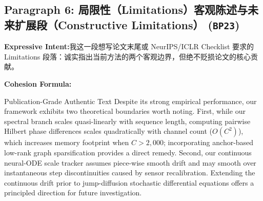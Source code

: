 \subsection*{Paragraph 6: 局限性（Limitations）客观陈述与未来扩展段（Constructive Limitations） (\texttt{BP23})}
\noindent\textbf{Expressive Intent:}\enspace 我这一段想写论文末尾或 NeurIPS/ICLR Checklist 要求的 Limitations 段落：诚实指出当前方法的两个客观边界，但绝不贬损论文的核心贡献。\par
\noindent\textbf{Cohesion Formula:}\par\vspace{4pt}
\begin{ExampleBox}{Publication-Grade Authentic Text}
Despite its strong empirical performance, our framework exhibits two theoretical boundaries worth noting. First, while our spectral branch scales quasi-linearly with sequence length, computing pairwise Hilbert phase differences scales quadratically with channel count ($O(C^2)$), which increases memory footprint when $C > 2,000$; incorporating anchor-based low-rank graph sparsification provides a direct remedy. Second, our continuous neural-ODE scale tracker assumes piece-wise smooth drift and may smooth over instantaneous step discontinuities caused by sensor recalibration. Extending the continuous drift prior to jump-diffusion stochastic differential equations offers a principled direction for future investigation.
\end{ExampleBox}
